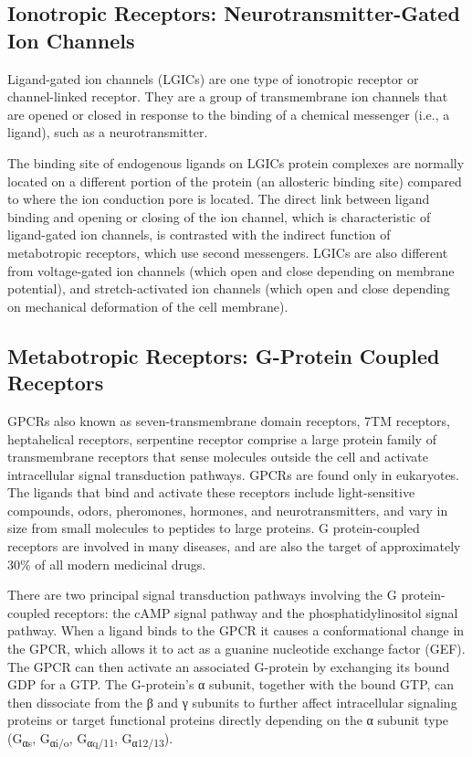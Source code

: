\hypertarget{ionotropic-receptors-neurotransmitter-gated-ion-channels}{%
\subsection{Ionotropic Receptors: Neurotransmitter-Gated Ion Channels}\label{ionotropic-receptors-neurotransmitter-gated-ion-channels}}

Ligand-gated ion channels (LGICs) are one type of ionotropic receptor or channel-linked receptor. They are a group of transmembrane ion channels that are opened or closed in response to the binding of a chemical messenger (i.e., a ligand), such as a neurotransmitter.

The binding site of endogenous ligands on LGICs protein complexes are normally located on a different portion of the protein (an allosteric binding site) compared to where the ion conduction pore is located. The direct link between ligand binding and opening or closing of the ion channel, which is characteristic of ligand-gated ion channels, is contrasted with the indirect function of metabotropic receptors, which use second messengers. LGICs are also different from voltage-gated ion channels (which open and close depending on membrane potential), and stretch-activated ion channels (which open and close depending on mechanical deformation of the cell membrane).

\hypertarget{metabotropic-receptors-g-protein-coupled-receptors}{%
\subsection{Metabotropic Receptors: G-Protein Coupled Receptors}\label{metabotropic-receptors-g-protein-coupled-receptors}}

GPCRs also known as seven-transmembrane domain receptors, 7TM receptors, heptahelical receptors, serpentine receptor comprise a large protein family of transmembrane receptors that sense molecules outside the cell and activate intracellular signal transduction pathways. GPCRs are found only in eukaryotes. The ligands that bind and activate these receptors include light-sensitive compounds, odors, pheromones, hormones, and neurotransmitters, and vary in size from small molecules to peptides to large proteins. G protein-coupled receptors are involved in many diseases, and are also the target of approximately 30\% of all modern medicinal drugs.

There are two principal signal transduction pathways involving the G protein-coupled receptors: the cAMP signal pathway and the phosphatidylinositol signal pathway. When a ligand binds to the GPCR it causes a conformational change in the GPCR, which allows it to act as a guanine nucleotide exchange factor (GEF). The GPCR can then activate an associated G-protein by exchanging its bound GDP for a GTP. The G-protein's α subunit, together with the bound GTP, can then dissociate from the β and γ subunits to further affect intracellular signaling proteins or target functional proteins directly depending on the α subunit type (G\textsubscript{αs}, G\textsubscript{αi/o}, G\textsubscript{αq/11}, G\textsubscript{α12/13}).

